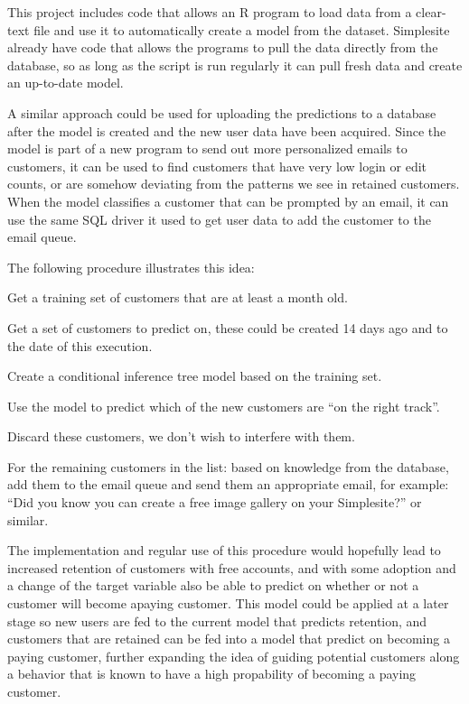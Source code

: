 This project includes code that allows an R program to load data from a clear-
text file and use it to automatically create a model from the dataset.
Simplesite already have code that allows the programs to pull the data directly
from the database, so as long as the script is run regularly it can pull fresh
data and create an up-to-date model.

A similar approach could be used for uploading the predictions to a database
after the model is created and the new user data have been acquired. Since the
model is part of a new program to send out more personalized emails to
customers, it can be used to find customers that have very low login or edit
counts, or are somehow deviating from the patterns we see in retained customers.
When the model classifies a customer that can be prompted by an email, it can use
the same SQL driver it used to get user data to add the customer to the email
queue.

The following procedure illustrates this idea:
\begin{enumerate*}
  \item Get a training set of customers that are at least a month old.
  \item Get a set of customers to predict on, these could be created 14 days ago
    and to the date of this execution.
  \item Create a conditional inference tree model based on the training set.
  \item Use the model to predict which of the new customers are ``on the right track''.
  \item Discard these customers, we don't wish to interfere with them.
  \item For the remaining customers in the list: based on knowledge from the
    database, add them to the email queue and send them an appropriate email,
    for example: ``Did you know you can create a free image gallery on your
    Simplesite?'' or similar.
\end{enumerate*}

The implementation and regular use of this procedure would hopefully lead to
increased retention of customers with free accounts, and with some adoption and
a change of the target variable also be able to predict on whether or not a
customer will become apaying customer. This model could be applied at a later
stage so new users are fed to the current model that predicts retention, and
customers that are retained can be fed into a model that predict on becoming a
paying customer, further expanding the idea of guiding potential customers along
a behavior that is known to have a high propability of becoming a paying
customer.
